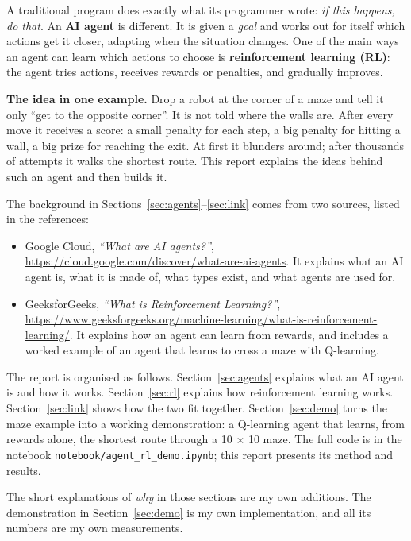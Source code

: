 \documentclass[11pt, a4paper]{article}
\newcommand{\code}[1]{\texttt{#1}}
\begin{document}
A traditional program does exactly what its programmer wrote: \emph{if this happens, do that}. An \textbf{AI agent} is different. It is given a \emph{goal} and works out for itself which actions get it closer, adapting when the situation changes. One of the main ways an agent can learn which actions to choose is \textbf{reinforcement learning (RL)}: the agent tries actions, receives rewards or penalties, and gradually improves.

\textbf{The idea in one example.} Drop a robot at the corner of a maze and tell it only ``get to the opposite corner''. It is not told where the walls are. After every move it receives a score: a small penalty for each step, a big penalty for hitting a wall, a big prize for reaching the exit. At first it blunders around; after thousands of attempts it walks the shortest route. This report explains the ideas behind such an agent and then builds it.

The background in Sections~\ref{sec:agents}--\ref{sec:link} comes from two sources, listed in the references:

\begin{itemize}
    \item Google Cloud, \emph{``What are AI agents?''}, \url{https://cloud.google.com/discover/what-are-ai-agents}. It explains what an AI agent is, what it is made of, what types exist, and what agents are used for.
    \item GeeksforGeeks, \emph{``What is Reinforcement Learning?''}, \url{https://www.geeksforgeeks.org/machine-learning/what-is-reinforcement-learning/}. It explains how an agent can learn from rewards, and includes a worked example of an agent that learns to cross a maze with Q-learning.
\end{itemize}

The report is organised as follows. Section~\ref{sec:agents} explains what an AI agent is and how it works. Section~\ref{sec:rl} explains how reinforcement learning works. Section~\ref{sec:link} shows how the two fit together. Section~\ref{sec:demo} turns the maze example into a working demonstration: a Q-learning agent that learns, from rewards alone, the shortest route through a 10 $\times$ 10 maze. The full code is in the notebook \code{notebook/agent\_rl\_demo.ipynb}; this report presents its method and results.

The short explanations of \emph{why} in those sections are my own additions. The demonstration in Section~\ref{sec:demo} is my own implementation, and all its numbers are my own measurements.
\end{document}
